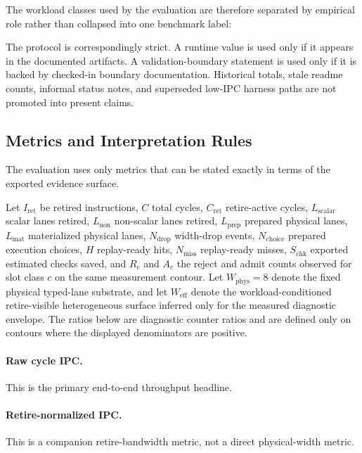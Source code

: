 \documentclass[twocolumn]{article}
\begin{document}
The workload classes used by the evaluation are therefore separated by empirical role rather than collapsed into one benchmark label:



The protocol is correspondingly strict. A runtime value is used only if it appears in the documented artifacts. A validation-boundary statement is used only if it is backed by checked-in boundary documentation. Historical totals, stale readme counts, informal status notes, and superseded low-IPC harness paths are not promoted into present claims.


\subsection{Metrics and Interpretation Rules}

The evaluation uses only metrics that can be stated exactly in terms of the exported evidence surface.

Let \(I_{\mathrm{ret}}\) be retired instructions, \(C\) total cycles, \(C_{\mathrm{ret}}\) retire-active cycles, \(L_{\mathrm{scalar}}\) scalar lanes retired, \(L_{\mathrm{non}}\) non-scalar lanes retired, \(L_{\mathrm{prep}}\) prepared physical lanes, \(L_{\mathrm{mat}}\) materialized physical lanes, \(N_{\mathrm{drop}}\) width-drop events, \(N_{\mathrm{choice}}\) prepared execution choices, \(H\) replay-ready hits, \(N_{\mathrm{miss}}\) replay-ready misses, \(S_{\mathrm{chk}}\) exported estimated checks saved, and \(R_c\) and \(A_c\) the reject and admit counts observed for slot class \(c\) on the same measurement contour. Let \(W_{\mathrm{phys}}=8\) denote the fixed physical typed-lane substrate, and let \(W_{\mathrm{eff}}\) denote the workload-conditioned retire-visible heterogeneous surface inferred only for the measured diagnostic envelope. The ratios below are diagnostic counter ratios and are defined only on contours where the displayed denominators are positive.

\paragraph{Raw cycle IPC.}

This is the primary end-to-end throughput headline.

\paragraph{Retire-normalized IPC.}

This is a companion retire-bandwidth metric, not a direct physical-width metric.
\end{document}
